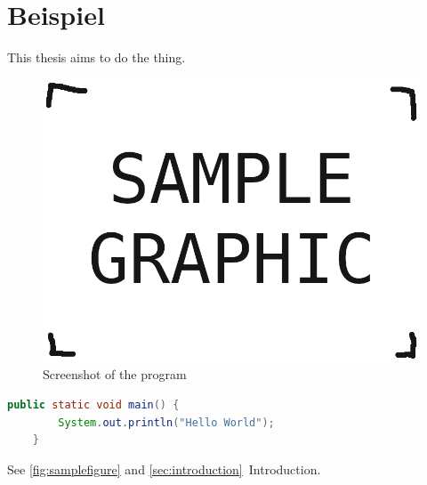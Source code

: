 \chapter{Beispiel} \label{sec:beispiel}

This thesis aims to do the thing\parencite{somewebsite}.

\begin{figure}[h]
	\includegraphics[width=\textwidth]{./grafiken/sample_graphic.png}
	\vskip0pt
	\caption{Screenshot of the program} \label{fig:samplefigure}
\end{figure}

\begin{lstlisting}[language=Java]
	public static void main() {
		System.out.println("Hello World");
	}
\end{lstlisting}

See \autoref{fig:samplefigure} and \autoref{sec:introduction}~Introduction.


